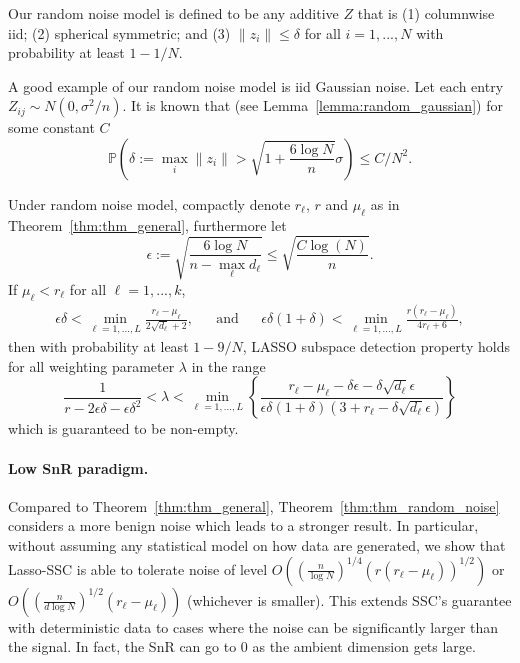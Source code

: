 \documentclass[twoside,11pt]{article}
\numberwithin{equation}{section}
\def\P{\mathbb{P}}
\begin{document}
\begin{definition}\label{def:Random_noise_model}
Our random noise model is defined to be any additive $Z$ that is (1) columnwise iid; (2) spherical symmetric;  and (3) $\|z_i\|\leq \delta$ for all $i=1,...,N$ with probability at least $1-1/N$.
\end{definition}
A good example of our random noise model is iid Gaussian noise. Let each entry $Z_{ij} \sim N(0,\sigma^2/n)$. It is known that (see Lemma~\ref{lemma:random_gaussian}) for some constant $C$
$$\P\left(\delta:=\max_i\|z_i\| > \sqrt{1+\frac{6\log N}{n}}\sigma\right) \leq C/N^2.$$

\begin{theorem}\label{thm:thm_random_noise}
 Under random noise model, compactly denote $r_{\ell}$, $r$ and $\mu_{\ell}$ as in Theorem~\ref{thm:thm_general}, furthermore let
$$\epsilon := \sqrt{\frac{6\log N}{n-\max_{\ell}{d_{\ell}}}}\leq \sqrt{\frac{C\log(N)}{n}}.$$
 If $\mu_{\ell}<r_{\ell}$ for all $\ell = 1,...,k$,
 \begin{align*}
 \epsilon\delta<\min_{\ell=1,...,L}\frac{r_{\ell}-\mu_{\ell}}{2\sqrt{d_{\ell}}+2}, &&\text{and}&& \epsilon\delta(1+\delta) < \min_{\ell=1,...,L}\frac{r(r_\ell-\mu_\ell)}{4r_\ell+6},
\end{align*}
then with probability at least $1-9/N$, LASSO subspace detection property holds for all weighting parameter $\lambda$ in the range
\begin{equation}\label{eq:thm_rand_noise_lambda_range}
\frac{1}{r- 2\epsilon \delta-\epsilon\delta^2}<
        \lambda<\min_{\ell=1,...,L}\left\{\frac{r_{\ell}-\mu_{\ell}-\delta\epsilon - \delta \sqrt{d_{\ell}} \epsilon}{\epsilon\delta(1+\delta)(3+r_{\ell}-\delta\sqrt{d_{\ell}}\epsilon)}\right\}
\end{equation}
which is guaranteed to be non-empty.
\end{theorem}
\paragraph{Low SnR paradigm.} Compared to Theorem~\ref{thm:thm_general}, Theorem~\ref{thm:thm_random_noise} considers a more benign noise which leads to a stronger result. In particular, without assuming any statistical model on how data are generated, we show that Lasso-SSC is able to tolerate noise of level $O\left((\frac{n}{\log N})^{1/4}(r(r_\ell-\mu_\ell))^{1/2}\right)$ or $O\left((\frac{n}{d\log N})^{1/2}(r_\ell-\mu_\ell)\right)$ (whichever is smaller). This extends SSC's guarantee with deterministic data to cases where the noise can be significantly larger than the signal. In fact, the SnR can go to $0$ as the ambient dimension gets large.
\end{document}

